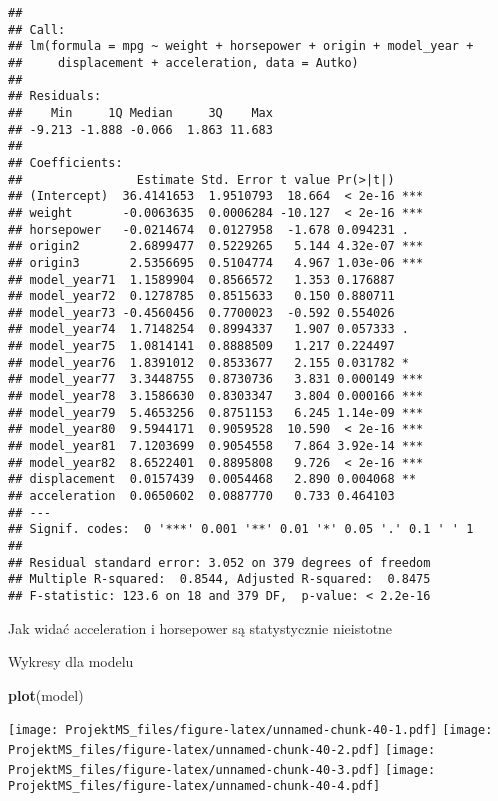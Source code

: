 \documentclass[
]{article}
\newenvironment{Shaded}{\begin{snugshade}}{\end{snugshade}}
\newcommand{\KeywordTok}[1]{\textcolor[rgb]{0.13,0.29,0.53}{\textbf{#1}}}
\newcommand{\NormalTok}[1]{#1}
\begin{document}
\begin{verbatim}
## 
## Call:
## lm(formula = mpg ~ weight + horsepower + origin + model_year + 
##     displacement + acceleration, data = Autko)
## 
## Residuals:
##    Min     1Q Median     3Q    Max 
## -9.213 -1.888 -0.066  1.863 11.683 
## 
## Coefficients:
##                Estimate Std. Error t value Pr(>|t|)    
## (Intercept)  36.4141653  1.9510793  18.664  < 2e-16 ***
## weight       -0.0063635  0.0006284 -10.127  < 2e-16 ***
## horsepower   -0.0214674  0.0127958  -1.678 0.094231 .  
## origin2       2.6899477  0.5229265   5.144 4.32e-07 ***
## origin3       2.5356695  0.5104774   4.967 1.03e-06 ***
## model_year71  1.1589904  0.8566572   1.353 0.176887    
## model_year72  0.1278785  0.8515633   0.150 0.880711    
## model_year73 -0.4560456  0.7700023  -0.592 0.554026    
## model_year74  1.7148254  0.8994337   1.907 0.057333 .  
## model_year75  1.0814141  0.8888509   1.217 0.224497    
## model_year76  1.8391012  0.8533677   2.155 0.031782 *  
## model_year77  3.3448755  0.8730736   3.831 0.000149 ***
## model_year78  3.1586630  0.8303347   3.804 0.000166 ***
## model_year79  5.4653256  0.8751153   6.245 1.14e-09 ***
## model_year80  9.5944171  0.9059528  10.590  < 2e-16 ***
## model_year81  7.1203699  0.9054558   7.864 3.92e-14 ***
## model_year82  8.6522401  0.8895808   9.726  < 2e-16 ***
## displacement  0.0157439  0.0054468   2.890 0.004068 ** 
## acceleration  0.0650602  0.0887770   0.733 0.464103    
## ---
## Signif. codes:  0 '***' 0.001 '**' 0.01 '*' 0.05 '.' 0.1 ' ' 1
## 
## Residual standard error: 3.052 on 379 degrees of freedom
## Multiple R-squared:  0.8544, Adjusted R-squared:  0.8475 
## F-statistic: 123.6 on 18 and 379 DF,  p-value: < 2.2e-16
\end{verbatim}

Jak widać acceleration i horsepower są statystycznie nieistotne

Wykresy dla modelu

\begin{Shaded}
\begin{Highlighting}[]
\KeywordTok{plot}\NormalTok{(model)}
\end{Highlighting}
\end{Shaded}

\texttt{[image: ProjektMS\_files/figure-latex/unnamed-chunk-40-1.pdf]}
\texttt{[image: ProjektMS\_files/figure-latex/unnamed-chunk-40-2.pdf]}
\texttt{[image: ProjektMS\_files/figure-latex/unnamed-chunk-40-3.pdf]}
\texttt{[image: ProjektMS\_files/figure-latex/unnamed-chunk-40-4.pdf]}
\end{document}
